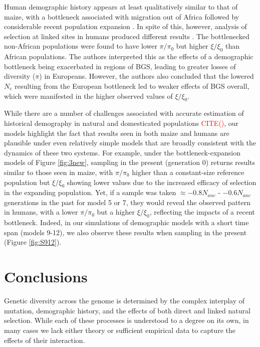 \documentclass[9pt,twocolumn,twoside]{rilabRxiv}
\newcommand{\citex}[1]{{\small \textcolor{red}{CITE(#1)}}}
\begin{document}
Human demographic history appears at least qualitatively similar to that of maize, with a bottleneck associated with migration out of Africa followed by considerable recent population expansion \citep{tennessen2012evolution}.
In spite of this, however, analysis of selection at linked sites in humans produced different results \citep{torres2018human}.
The bottlenecked non-African populations were found to have lower $\pi/\pi_0$ but higher $\xi/\xi_0$ than African populations. The authors interpreted this as the effects of a demographic bottleneck being exacerbated in regions of BGS, leading to greater losses of diversity ($\pi$) in Europeans. However, the authors also concluded that the lowered $N_e$ resulting from the European bottleneck led to weaker effects of BGS overall, which were manifested in the higher observed values of $\xi/\xi_0$.

While there are a number of challenges associated with accurate estimation of historical demography in natural and domesticated populations \citex{}, our models highlight the fact that results seen in both maize and humans are plausible under even relatively simple models that are broadly consistent with the dynamics of these two systems.
For example, under the bottleneck-expansion models of Figure \ref{fig:3new}, sampling in the present (generation 0) returns results similar to those seen in maize, with $\pi/\pi_0$ higher than a constant-size reference population but $\xi/\xi_0$ showing lower values due to the increased efficacy of selection in the expanding population.
Yet, if a sample was taken $\approx -0.8N_{anc}$ - $-0.6N_{anc}$ generations in the past for model 5 or 7, they would reveal the observed pattern in humans, with a lower $\pi/\pi_0$ but a higher $\xi/\xi_0$, reflecting the impacts of a recent bottleneck. Indeed, in our simulations of demographic models with a short time span (models 9-12), we also observe these results when sampling in the present (Figure \ref{fig:S912}).

\section{Conclusions}

Genetic diversity across the genome is determined by the complex interplay of mutation, demographic history, and the effects of both direct and linked natural selection. 
While each of these processes is understood to a degree on its own, in many cases we lack either theory or sufficient empirical data to capture the effects of their interaction.
\end{document}
